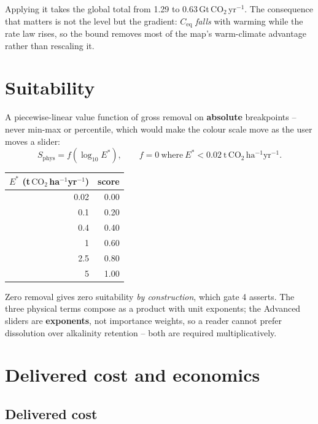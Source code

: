 \documentclass[11pt,a4paper]{article}
\newcommand{\cotwo}{\ensuremath{\mathrm{CO_2}}}
\begin{document}
Applying it takes the global total from 1.29 to
0.63\,Gt\,\cotwo{}\,yr$^{-1}$. The consequence that matters is not the
level but the gradient: $C_{\mathrm{eq}}$ \emph{falls} with warming while the rate
law rises, so the bound removes most of the map's warm-climate advantage rather
than rescaling it.

\section{Suitability}
\label{sec:suit}

A piecewise-linear value function of gross removal on \textbf{absolute}
breakpoints -- never min-max or percentile, which would make the colour scale
move as the user moves a slider:
\begin{equation}
S_{\mathrm{phys}} = f\!\left(\log_{10} E^{\ast}\right),
\qquad
f = 0 \ \text{where}\ E^{\ast} < 0.02\
\mathrm{t\,\cotwo{}\,ha^{-1}yr^{-1}} .
\end{equation}

\begin{center}\small
\begin{tabular}{rr}
\toprule
$E^{\ast}$ (t\,\cotwo{}\,ha$^{-1}$yr$^{-1}$) & score \\
\midrule
0.02 & 0.00 \\
0.1 & 0.20 \\
0.4 & 0.40 \\
1 & 0.60 \\
2.5 & 0.80 \\
5 & 1.00 \\
\bottomrule
\end{tabular}
\end{center}

Zero removal gives zero suitability \emph{by construction}, which gate 4 asserts.
The three physical terms compose as a product with unit exponents; the Advanced
sliders are \textbf{exponents}, not importance weights, so a reader cannot prefer
dissolution over alkalinity retention -- both are required multiplicatively.

\section{Delivered cost and economics}
\label{sec:econ}

\subsection{Delivered cost}
\end{document}
